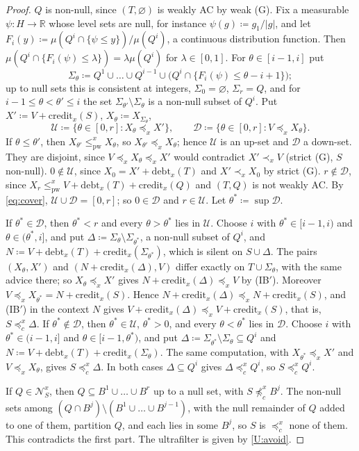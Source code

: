 \documentclass[11pt]{article}
\theoremstyle{definition}\newtheorem{definition}[theorem]{Definition}
\theoremstyle{remark}\newtheorem{remark}[theorem]{Remark}
\newcommand{\R}{\mathbb R}
\newcommand{\debt}{\mathrm{debt}}
\newcommand{\cred}{\mathrm{credit}}
\newcommand{\Nid}{\mathcal N}
\newcommand{\pw}{\mathrm{pw}}
\begin{document}
\begin{proof}
$Q$ is non-null, since $(T,\varnothing)$ is weakly AC by weak (G). Fix a
measurable $\psi\colon H\to\R$ whose level sets are null, for instance
$\psi(g)\coloneqq g_1/|g|$, and let $F_i(y)\coloneqq\mu(Q^i\cap\{\psi\le
y\})/\mu(Q^i)$, a continuous distribution function. Then
$\mu(Q^i\cap\{F_i(\psi)\le\lambda\})=\lambda\mu(Q^i)$ for $\lambda\in[0,1]$.
For $\theta\in[i-1,i]$ put
\[
 \Sigma_\theta\coloneqq Q^1\cup\dots\cup Q^{i-1}\cup
 \bigl(Q^i\cap\{F_i(\psi)\le\theta-i+1\}\bigr);
\]
up to null sets this is consistent at integers, $\Sigma_0=\varnothing$,
$\Sigma_r=Q$, and for $i-1\le\theta<\theta'\le i$ the set
$\Sigma_{\theta'}\setminus\Sigma_\theta$ is a non-null subset of $Q^i$. Put
$X'\coloneqq V+\cred_x(S)$, $X_\theta\coloneqq X_{\Sigma_\theta}$,
\[
 \mathcal U\coloneqq\{\theta\in[0,r]:X_\theta\preceq_xX'\},\qquad
 \mathcal D\coloneqq\{\theta\in[0,r]:V\preceq_xX_\theta\}.
\]
If $\theta\le\theta'$, then $X_{\theta'}\le^x_\pw X_\theta$, so
$X_{\theta'}\preceq_xX_\theta$; hence $\mathcal U$ is an up-set and
$\mathcal D$ a down-set. They are disjoint, since
$V\preceq_xX_\theta\preceq_xX'$ would contradict $X'\prec_xV$ (strict (G),
$S$ non-null). $0\notin\mathcal U$, since $X_0=X'+\debt_x(T)$ and
$X'\prec_xX_0$ by strict (G). $r\notin\mathcal D$, since
$X_r\le^x_\pw V+\debt_x(T)+\cred_x(Q)$ and $(T,Q)$ is not weakly AC. By
\eqref{eq:cover}, $\mathcal U\cup\mathcal D=[0,r]$; so $0\in\mathcal D$ and
$r\in\mathcal U$. Let $\theta^*\coloneqq\sup\mathcal D$.

If $\theta^*\in\mathcal D$, then $\theta^*<r$ and every $\theta>\theta^*$
lies in $\mathcal U$. Choose $i$ with $\theta^*\in[i-1,i)$ and
$\theta\in(\theta^*,i]$, and put $\Delta\coloneqq\Sigma_\theta\setminus
\Sigma_{\theta^*}$, a non-null subset of $Q^i$, and
$N\coloneqq V+\debt_x(T)+\cred_x(\Sigma_{\theta^*})$, which is silent on
$S\cup\Delta$. The pairs $(X_\theta,X')$ and $(N+\cred_x(\Delta),V)$ differ
exactly on $T\cup\Sigma_\theta$, with the same advice there; so
$X_\theta\preceq_xX'$ gives $N+\cred_x(\Delta)\preceq_xV$ by (IB$'$).
Moreover $V\preceq_xX_{\theta^*}=N+\cred_x(S)$. Hence
$N+\cred_x(\Delta)\preceq_xN+\cred_x(S)$, and (IB$'$) in the context $N$
gives $V+\cred_x(\Delta)\preceq_xV+\cred_x(S)$, that is,
$S\preceq^x_c\Delta$. If $\theta^*\notin\mathcal D$, then
$\theta^*\in\mathcal U$, $\theta^*>0$, and every $\theta<\theta^*$ lies in
$\mathcal D$. Choose $i$ with $\theta^*\in(i-1,i]$ and
$\theta\in[i-1,\theta^*)$, and put $\Delta\coloneqq\Sigma_{\theta^*}
\setminus\Sigma_\theta\subseteq Q^i$ and $N\coloneqq V+\debt_x(T)+
\cred_x(\Sigma_\theta)$. The same computation, with
$X_{\theta^*}\preceq_xX'$ and $V\preceq_xX_\theta$, gives
$S\preceq^x_c\Delta$. In both cases $\Delta\subseteq Q^i$ gives
$\Delta\preceq^x_cQ^i$, so $S\preceq^x_cQ^i$.

If $Q\in\Nid^x_S$, then $Q\subseteq B^1\cup\dots\cup B^r$ up to a null set,
with $S\not\preceq^x_cB^j$. The non-null sets among
$(Q\cap B^j)\setminus(B^1\cup\dots\cup B^{j-1})$, with the null remainder of
$Q$ added to one of them, partition $Q$, and each lies in some $B^j$, so
$S$ is $\preceq^x_c$ none of them. This contradicts the first part. The
ultrafilter is given by \ref{U:avoid}.
\end{proof}
\end{document}
